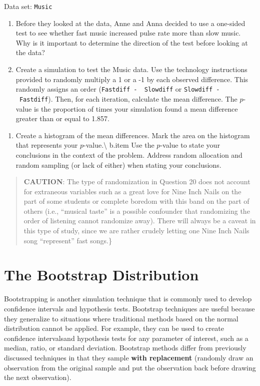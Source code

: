 \documentclass[
]{book}
\providecommand{\tightlist}{%
  \setlength{\itemsep}{0pt}\setlength{\parskip}{0pt}}
\begin{document}
Data set: \texttt{Music}

\begin{enumerate}
\def\labelenumi{\arabic{enumi}.}
\setcounter{enumi}{18}
\item
  Before they looked at the data, Anne and Anna decided to use a one-sided test to see whether fast music increased pulse rate more than slow music. Why is it important to determine the direction of the test before looking at the data?
\item
  Create a simulation to test the Music data. Use the technology instructions provided to randomly multiply a 1 or a -1 by each observed difference. This randomly assigns an order (\texttt{Fastdiff\ -\ \ Slowdiff} or \texttt{Slowdiff\ -\ Fastdiff}). Then, for each iteration, calculate the mean difference. The \(p\)-value is the proportion of times your simulation found a mean difference greater than or equal to 1.857.
\end{enumerate}

\begin{enumerate}
\def\labelenumi{\alph{enumi}.}
\tightlist
\item
  Create a histogram of the mean differences. Mark the area on the histogram that represents your \(p\)-value.\textbackslash{}
  b.item Use the \(p\)-value to state your conclusions in the context of the problem. Address random allocation and random sampling (or lack of either) when stating your conclusions.
\end{enumerate}

\begin{quote}
\textbf{CAUTION}: The type of randomization in Question 20 does not account for extraneous variables such as a great love for Nine Inch Nails on the part of some students or complete boredom with this band on the part of others (i.e., ``musical taste'' is a possible confounder that randomizing the order of listening cannot randomize away). There will always be a caveat in this type of study, since we are rather crudely letting one Nine Inch Nails song ``represent'' fast songs.\}
\end{quote}

\hypertarget{the-bootstrap-distribution}{%
\section{The Bootstrap Distribution}\label{the-bootstrap-distribution}}

Bootstrapping is another simulation technique that is commonly used to develop confidence intervals and hypothesis tests. Bootstrap techniques are useful because they generalize to situations where traditional methods based on the normal distribution cannot be applied. For example, they can be used to create confidence intervalsand hypothesis tests for any parameter of interest, such as a median, ratio, or standard deviation. Bootstrap methods differ from previously discussed techniques in that they sample \textbf{with replacement} (randomly draw
an observation from the original sample and put the observation back before drawing the next observation).
\end{document}
